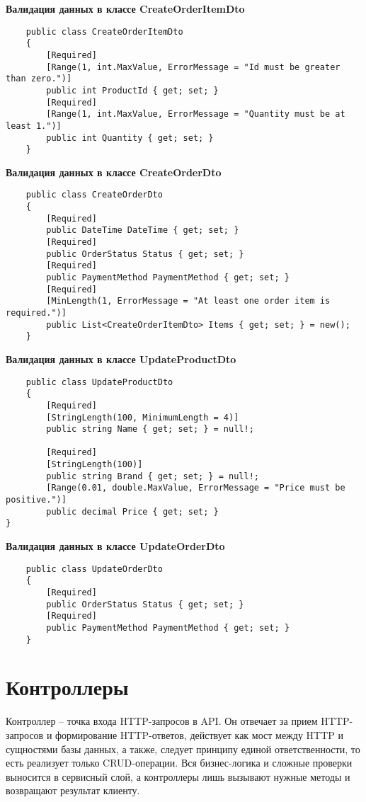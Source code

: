 \documentclass[a4paper,12pt]{report}
\begin{document}
\textbf{Валидация данных в классе CreateOrderItemDto}
\begin{verbatim}
    public class CreateOrderItemDto
    {
        [Required]
        [Range(1, int.MaxValue, ErrorMessage = "Id must be greater than zero.")]
        public int ProductId { get; set; }
        [Required]
        [Range(1, int.MaxValue, ErrorMessage = "Quantity must be at least 1.")]
        public int Quantity { get; set; }
    }
\end{verbatim}

\textbf{Валидация данных в классе CreateOrderDto}
\begin{verbatim}
    public class CreateOrderDto
    {
        [Required]
        public DateTime DateTime { get; set; }
        [Required]
        public OrderStatus Status { get; set; }
        [Required]
        public PaymentMethod PaymentMethod { get; set; }
        [Required]
        [MinLength(1, ErrorMessage = "At least one order item is required.")]
        public List<CreateOrderItemDto> Items { get; set; } = new();
    }
\end{verbatim}

\textbf{Валидация данных в классе UpdateProductDto}
\begin{verbatim}
    public class UpdateProductDto
    {
        [Required]
        [StringLength(100, MinimumLength = 4)]
        public string Name { get; set; } = null!;

        [Required]
        [StringLength(100)]
        public string Brand { get; set; } = null!;
        [Range(0.01, double.MaxValue, ErrorMessage = "Price must be positive.")]
        public decimal Price { get; set; }
}
\end{verbatim}

\textbf{Валидация данных в классе UpdateOrderDto}
\begin{verbatim}
    public class UpdateOrderDto
    {
        [Required]
        public OrderStatus Status { get; set; }
        [Required]
        public PaymentMethod PaymentMethod { get; set; }
    }
\end{verbatim}

\section{Контроллеры}

Контроллер -- точка входа \acs{HTTP}-запросов в \acs{API}. Он отвечает за прием \acs{HTTP}-запросов и формирование \acs{HTTP}-ответов, 
действует как мост между \acs{HTTP} и сущностями базы данных, а также, следует принципу единой ответственности, то есть реализует 
только \acs{CRUD}-операции. Вся бизнес-логика и сложные проверки выносится в сервисный слой, а контроллеры лишь вызывают нужные 
методы и возвращают результат клиенту.
\end{document}
